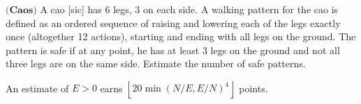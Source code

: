 $\textbf{(Caos)}$ A cao [sic] has 6 legs, 3 on each side.  A walking pattern for the cao is defined as an ordered sequence of raising and lowering each of the legs exactly once (altogether 12 actions), starting and ending with all legs on the ground.  The pattern is safe if at any point, he has at least 3 legs on the ground and not all three legs are on the same side.  Estimate  the number of safe patterns.

An estimate of $E > 0$ earns $\left\lfloor 20\min(N/E, E/N)^4 \right\rfloor$ points.